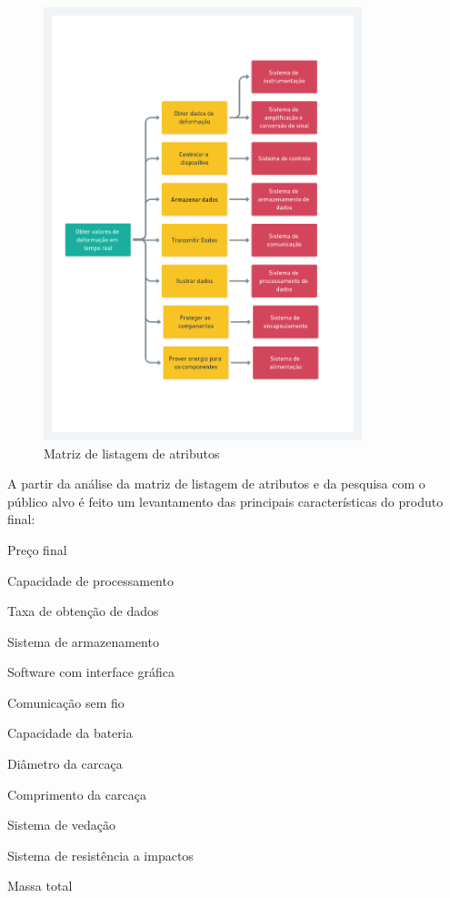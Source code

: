 \begin{figure}[H]
	\caption{\label{fig:2031} Matriz de listagem de atributos}
	\begin{center}
		\includegraphics[width=350]{pictures/2031.png}
	\end{center}
\end{figure}

A partir da análise da matriz de listagem de atributos e da pesquisa com o público alvo é feito um levantamento das principais características do produto final:

\begin{alineas}

	\item Preço final
	\item Capacidade de processamento
	\item Taxa de obtenção de dados
	\item Sistema de armazenamento
	\item Software com interface gráfica
	\item Comunicação sem fio
	\item Capacidade da bateria
	\item Diâmetro da carcaça
	\item Comprimento da carcaça
	\item Sistema de vedação
	\item Sistema de resistência a impactos
	\item Massa total

\end{alineas}


